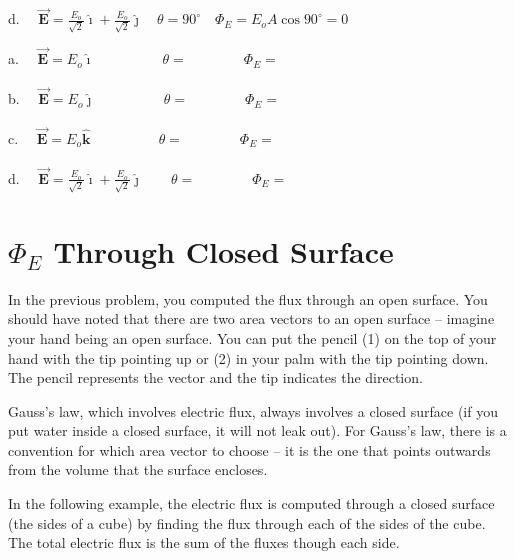 \documentclass{article}
\newcommand{\ds}[0]{\displaystyle}
\newcommand{\ihat}[0]{\hat{\boldsymbol{\imath}}}
\newcommand{\jhat}[0]{\hat{\boldsymbol{\jmath}}}
\newcommand{\khat}[0]{\hat{\boldsymbol{k}}}
\newcommand{\bfvec}[1]{\vec{\mathbf{#1}}}
\begin{document}
d. $\quad\ds\bfvec{E}=\frac{E_o}{\sqrt{2}}\ihat + \frac{E_o}{\sqrt{2}}\jhat\quad\theta=90^\circ\quad\Phi_E=E_oA\cos 90^\circ=0$
\else



a. $\quad\ds\bfvec{E}=E_o\ihat\qquad\phantom{+\frac{E_o}{\sqrt{2}}\jhat}\theta=\qquad\qquad\Phi_E=$

b. $\quad\ds\bfvec{E}=E_o\jhat\qquad\phantom{+ \frac{E_o}{\sqrt{2}}\jhat}\theta=\qquad\qquad\Phi_E=$ 

c. $\quad\ds\bfvec{E}=E_o\khat\qquad\phantom{+\frac{E_o}{\sqrt{2}}\jhat}\theta=\qquad\qquad\Phi_E=$ 

d. $\quad\ds\bfvec{E}=\frac{E_o}{\sqrt{2}}\ihat + \frac{E_o}{\sqrt{2}}\jhat\qquad\theta=\qquad\qquad\Phi_E=$
\fi

\section{$\Phi_E$ Through Closed Surface}

In the previous problem, you computed the flux through an open surface. You should have noted that there are two area vectors to an open surface -- imagine your hand being an open surface. You can put the pencil (1) on the top of your hand with the tip pointing up or (2) in your palm with the tip pointing down. The pencil represents the vector and the tip indicates the direction.

Gauss's law, which involves electric flux, always involves a closed surface (if you put water inside a closed surface, it will not leak out). For Gauss's law, there is a convention for which area vector to choose -- it is the one that points outwards from the volume that the surface encloses. 

In the following example, the electric flux is computed through a closed surface (the sides of a cube) by finding the flux through each of the sides of the cube. The total electric flux is the sum of the fluxes though each side.

\end{document}
